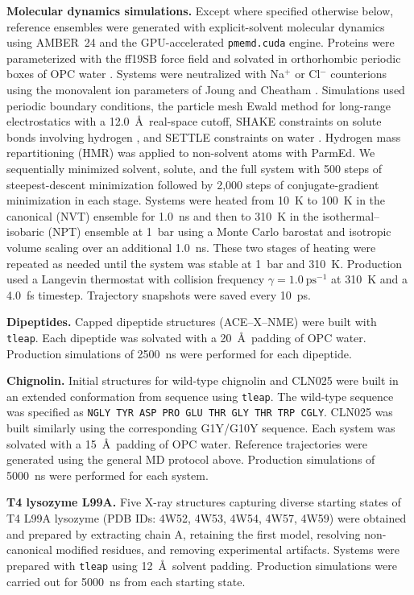 \documentclass[journal=jctcce,manuscript=article,layout=twocolumn,hyperref=true]{achemso}
\begin{document}
	\textbf{Molecular dynamics simulations.} Except where specified otherwise below, reference ensembles were generated with explicit-solvent molecular dynamics using AMBER~24 \cite{case2025amber} and the GPU-accelerated \texttt{pmemd.cuda} engine. Proteins were parameterized with the ff19SB force field \cite{tian2020ff19sb} and solvated in orthorhombic periodic boxes of OPC water \cite{izadi2014opc}. Systems were neutralized with Na$^+$ or Cl$^-$ counterions using the monovalent ion parameters of Joung and Cheatham \cite{joung2008ions}. Simulations used periodic boundary conditions, the particle mesh Ewald method for long-range electrostatics with a 12.0~\AA\ real-space cutoff, SHAKE constraints on solute bonds involving hydrogen \cite{ryckaert1977shake}, and SETTLE constraints on water \cite{miyamoto1992settle}.  Hydrogen mass repartitioning (HMR) was applied to non-solvent atoms with ParmEd. We sequentially minimized solvent, solute, and the full system with 500 steps of steepest-descent minimization followed by 2,000 steps of conjugate-gradient minimization in each stage. Systems were heated from 10~K to 100~K in the canonical (NVT) ensemble for 1.0~ns and then to 310~K in the isothermal--isobaric (NPT) ensemble at 1~bar using a Monte Carlo barostat and isotropic volume scaling over an additional 1.0~ns. These two stages of heating were repeated as needed until the system was stable at 1~bar and 310~K. Production used a Langevin thermostat with collision frequency $\gamma = 1.0~\mathrm{ps}^{-1}$ at 310~K and a 4.0~fs timestep. Trajectory snapshots were saved every 10~ps. 
	
	\textbf{Dipeptides.} Capped dipeptide structures (ACE--X--NME) were built with \texttt{tleap}. Each dipeptide was solvated with a 20~\AA\ padding of OPC water. Production simulations of 2500~ns were performed for each dipeptide.
	
	\textbf{Chignolin.} Initial structures for wild-type chignolin and CLN025 were built in an extended conformation from sequence using \texttt{tleap}. The wild-type sequence was specified as \texttt{NGLY TYR ASP PRO GLU THR GLY THR TRP CGLY}. CLN025 was built similarly using the corresponding G1Y/G10Y sequence. Each system was solvated with a 15~\AA\ padding of OPC water. Reference trajectories were generated using the general MD protocol above. Production simulations of 5000~ns were performed for each system.
	
	\textbf{T4 lysozyme L99A.} Five X-ray structures capturing diverse starting states of T4 L99A lysozyme (PDB IDs: 4W52, 4W53, 4W54, 4W57, 4W59) were obtained and prepared by extracting chain A, retaining the first model, resolving non-canonical modified residues, and removing experimental artifacts. Systems were prepared with \texttt{tleap} using 12~\AA\ solvent padding. Production simulations were carried out for 5000~ns from each starting state.
	
\end{document}
